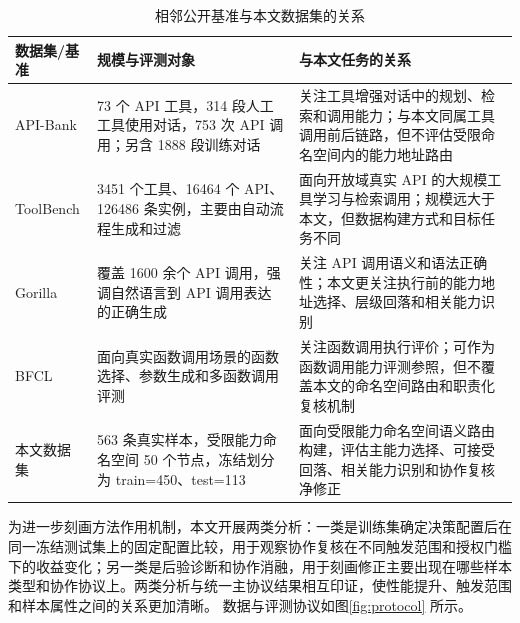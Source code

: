 \documentclass[10pt,a4paper,twocolumn,fontset=fandol]{ctexart}
\begin{document}
\begin{table}[htbp]
\centering
\caption{相邻公开基准与本文数据集的关系}
\label{tab:neighbor_datasets}
\small
\setlength{\tabcolsep}{5pt}
\begin{tabularx}{0.96\textwidth}{p{2.8cm}p{4.0cm}Y}
\toprule
数据集/基准 & 规模与评测对象 & 与本文任务的关系 \\
\midrule
API-Bank\cite{apibank} & 73 个 API 工具，314 段人工工具使用对话，753 次 API 调用；另含 1888 段训练对话 & 关注工具增强对话中的规划、检索和调用能力；与本文同属工具调用前后链路，但不评估受限命名空间内的能力地址路由 \\
ToolBench\cite{toollm} & 3451 个工具、16464 个 API、126486 条实例，主要由自动流程生成和过滤 & 面向开放域真实 API 的大规模工具学习与检索调用；规模远大于本文，但数据构建方式和目标任务不同 \\
Gorilla\cite{gorilla} & 覆盖 1600 余个 API 调用，强调自然语言到 API 调用表达的正确生成 & 关注 API 调用语义和语法正确性；本文更关注执行前的能力地址选择、层级回落和相关能力识别 \\
BFCL\cite{bfcl} & 面向真实函数调用场景的函数选择、参数生成和多函数调用评测 & 关注函数调用执行评价；可作为函数调用能力评测参照，但不覆盖本文的命名空间路由和职责化复核机制 \\
本文数据集 & 563 条真实样本，受限能力命名空间 50 个节点，冻结划分为 train=450、test=113 & 面向受限能力命名空间语义路由构建，评估主能力选择、可接受回落、相关能力识别和协作复核净修正 \\
\bottomrule
\end{tabularx}
\end{table}

为进一步刻画方法作用机制，本文开展两类分析：一类是训练集确定决策配置后在同一冻结测试集上的固定配置比较，用于观察协作复核在不同触发范围和授权门槛下的收益变化；另一类是后验诊断和协作消融，用于刻画修正主要出现在哪些样本类型和协作协议上。两类分析与统一主协议结果相互印证，使性能提升、触发范围和样本属性之间的关系更加清晰。
数据与评测协议如图\ref{fig:protocol} 所示。
\end{document}
